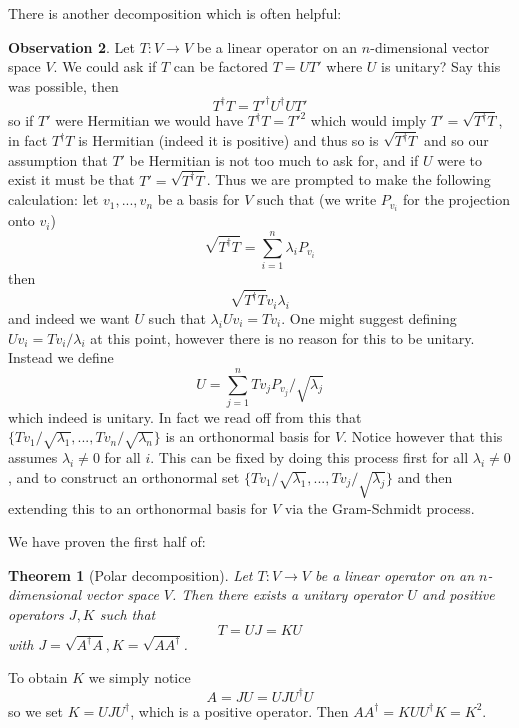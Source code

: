 \documentclass[12pt]{article}
\theoremstyle{plain}
\newtheorem{thm}{Theorem}[subsection] %
\theoremstyle{definition}
\newtheorem{observation}[thm]{Observation}
\newcommand{\lto}{\longrightarrow}
\begin{document}
There is another decomposition which is often helpful:
\begin{observation}
Let $T: V \lto V$ be a linear operator on an $n$-dimensional vector space $V$. We could ask if $T$ can be factored $T = UT'$ where $U$ is unitary? Say this was possible, then
\begin{equation}
T^\dagger T = T'^\dagger U^\dagger U T'
\end{equation}
so if $T'$ were Hermitian we would have $T^\dagger T = T'^2$ which would imply $T' = \sqrt{T^\dagger T}$, in fact $T^\dagger T$ is Hermitian (indeed it is positive) and thus so is $\sqrt{T^\dagger T}$ and so our assumption that $T'$ be Hermitian is not too much to ask for, and if $U$ were to exist it must be that $T' = \sqrt{T^\dagger T}$. Thus we are prompted to make the following calculation: let $v_1,...,v_n$ be a basis for $V$ such that (we write $P_{v_i}$ for the projection onto $v_i$)
\begin{equation}
\sqrt{T^\dagger T} = \sum_{i = 1}^n \lambda_i P_{v_i}
\end{equation}
then
\begin{equation}
\sqrt{T^\dagger T}v_i \lambda_i
\end{equation}
and indeed we want $U$ such that $\lambda_i Uv_i = Tv_i$. One might suggest defining $Uv_i = Tv_i/\lambda_i$ at this point, however there is no reason for this to be unitary. Instead we define
\begin{equation}
U = \sum_{j = 1}^n Tv_jP_{v_j}/\sqrt{\lambda_j}
\end{equation}
which indeed is unitary.  In fact we read off from this that $\lbrace Tv_1/\sqrt{\lambda_1},...,Tv_n/\sqrt{\lambda_n}\rbrace$ is an orthonormal basis for $V$. Notice however that this assumes $\lambda_i \neq 0$ for all $i$. This can be fixed by doing this process first for all $\lambda_i \neq 0$, and to construct an orthonormal set $\lbrace Tv_1/\sqrt{\lambda_1},...,Tv_j/\sqrt{\lambda_j}\rbrace$ and then extending this to an orthonormal basis for $V$ via the Gram-Schmidt process.

We have proven the first half of:
\begin{thm}[Polar decomposition]
Let $T: V \lto V$ be a linear operator on an $n$-dimensional vector space $V$. Then there exists a unitary operator $U$ and positive operators $J,K$ such that
\begin{equation}
T = UJ = KU
\end{equation}
with $J = \sqrt{A^\dagger A}, K = \sqrt{AA^\dagger}$.
\end{thm}
To obtain $K$ we simply notice
\begin{equation}
A = JU = UJU^\dagger  U
\end{equation}
so we set $K = UJU^\dagger$, which is a positive operator. Then $AA^\dagger = KUU^\dagger K = K^2$.
\end{observation}
\end{document}
